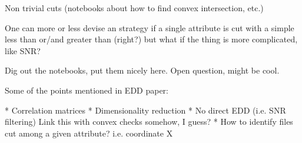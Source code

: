 
Non trivial cuts (notebooks about how to find convex intersection, etc.)

One can more or less devise an strategy if a single attribute is cut with a simple
less than or/and greater than (right?) but what if the thing is more complicated,
like SNR?

Dig out the notebooks, put them nicely here. Open question, might be cool.

Some of the points mentioned in EDD paper:

* Correlation matrices
* Dimensionality reduction
* No direct EDD (i.e. SNR filtering) Link this with convex checks somehow, I guess?
* How to identify files cut among a given attribute? i.e. coordinate X
